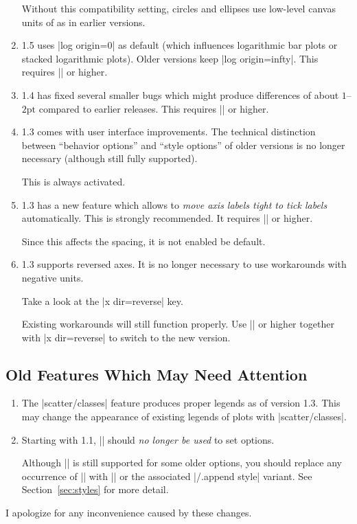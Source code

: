 \begin{enumerate}
        Without this compatibility setting, circles and ellipses use
        low-level canvas units of \pgfname{} as in earlier versions.
    \item \PGFPlots{} 1.5 uses |log origin=0| as default (which influences
        logarithmic bar plots or stacked logarithmic plots). Older versions
        keep |log origin=infty|. This requires |\pgfplotsset{compat=1.5}| or
        higher.
    \item \PGFPlots{} 1.4 has fixed several smaller bugs which might produce
        differences of about $1$--$2\text{pt}$ compared to earlier releases.
        This requires |\pgfplotsset{compat=1.4}| or higher.
    \item \PGFPlots{} 1.3 comes with user interface improvements. The
        technical distinction between ``behavior options'' and ``style
        options'' of older versions is no longer necessary (although still
        fully supported).

        This is always activated.
    \item \PGFPlots{} 1.3 has a new feature which allows to \emph{move axis
        labels tight to tick labels} automatically. This is strongly
        recommended. It requires |\pgfplotsset{compat=1.3}| or higher.

        Since this affects the spacing, it is not enabled be default.
    \item \PGFPlots{} 1.3 supports reversed axes. It is no longer necessary
        to use workarounds with negative units. 

        Take a look at the |x dir=reverse| key.

        Existing workarounds will still function properly. Use
        |\pgfplotsset{compat=1.3}| or higher together with |x dir=reverse| to
        switch to the new version.
\end{enumerate}


\subsection{Old Features Which May Need Attention}

\begin{enumerate}
    \item The |scatter/classes| feature produces proper legends as of version
        1.3. This may change the appearance of existing legends of plots with
        |scatter/classes|.
    \item Starting with \PGFPlots{} 1.1, |\tikzstyle| should \emph{no longer
        be used} to set \PGFPlots{} options.

        Although |\tikzstyle| is still supported for some older \PGFPlots{}
        options, you should replace any occurrence of |\tikzstyle| with
        ||
        or the associated |/.append style| variant. See
        Section~\ref{sec:styles} for more detail.
\end{enumerate}
%
I apologize for any inconvenience caused by these changes.

